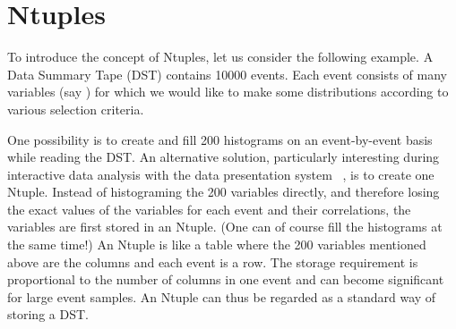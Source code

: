 %

\newcommand{\RWN}{RWN\index{Ntuple!Row-Wise-Ntuple}}
\newcommand{\CWN}{CWN\index{Ntuple!Column-Wise-Ntuple}}

\chapter{Ntuples}
\label{HNTUPLE}

To introduce the concept of Ntuples, let us consider
the following example.
A Data Summary Tape (DST) contains 10000 events.
Each event consists of many variables (say )
for which we would like to make some distributions
according to various selection criteria.
 
One possibility is to create and fill 200 histograms
on an event-by-event basis while reading the DST.
An alternative solution, particularly interesting
during interactive data analysis with
the data presentation system \PAW~\cite{bib-PAW},
is to create one Ntuple. 
Instead of histograming the 200 variables directly, and therefore
losing the exact values of the variables
for each event and their correlations,
the variables are first stored in an Ntuple.
(One can of course fill the histograms at the same time!)
An Ntuple is like a table where the 200 variables
mentioned above are the columns and each event is a row.
The storage requirement is proportional
to the number of columns in one event and can become
significant for large event samples.
An Ntuple can thus be regarded as a standard way of storing a DST.
 
